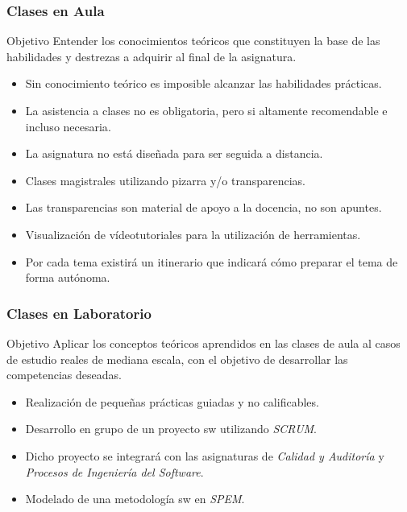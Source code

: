 \documentclass[animated,a4paper,slidestop,xcolor=pst,blue]{beamer}
\begin{document}
\begin{frame}
	\frametitle{Clases en Aula}
	\begin{block}{Objetivo}
        Entender los conocimientos teóricos que constituyen la base de las habilidades y destrezas a adquirir al final de la asignatura.
	\end{block}
	\begin{itemize}
		\item<2-> \alert{Sin conocimiento teórico es imposible alcanzar las habilidades prácticas}.
        \item<3-> La asistencia a clases no es obligatoria, \alert{pero si altamente recomendable e incluso necesaria}.
        \item<4-> La asignatura no está diseñada para ser seguida a distancia.		
        \item<5-> Clases magistrales utilizando pizarra y/o transparencias.
		\item<6-> \alert{Las transparencias} son material de apoyo a la docencia, \alert{no son apuntes}.
        \item<7-> Visualización de vídeotutoriales para la utilización de herramientas.
        \item<8-> Por cada tema existirá un itinerario que indicará cómo preparar el tema de forma autónoma.
	\end{itemize}
\end{frame}

\begin{frame}[c]
	\frametitle{Clases en Laboratorio}
	\begin{block}{Objetivo}
        Aplicar los conceptos teóricos aprendidos en las clases de aula al casos de estudio reales de mediana escala, con el objetivo de desarrollar las competencias deseadas.
	\end{block}
	\begin{itemize}[<+->]
        \item Realización de pequeñas prácticas guiadas y no calificables.
        \item Desarrollo \alert{en grupo} de un proyecto sw utilizando \emph{SCRUM}.
        \item Dicho proyecto se integrará con las asignaturas de \emph{Calidad y Auditoría} y \emph{Procesos de Ingeniería del Software}.
        \item Modelado de una metodología sw en \emph{SPEM}.
	\end{itemize}
\end{frame}
\end{document}

